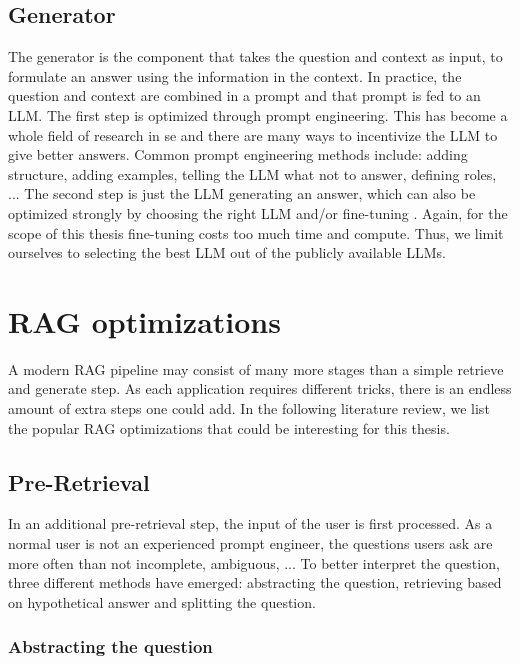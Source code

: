 \subsection{Generator}
The generator is the component that takes the question and context as input, to formulate an answer using the information in the context. In practice, the question and context are combined in a prompt and that prompt is fed to an LLM. The first step is optimized through prompt engineering. This has become a whole field of research in se and there are many ways to incentivize the LLM to give better answers. Common prompt engineering methods include: adding structure, adding examples, telling the LLM what not to answer, defining roles, ... \cite{brown2020language, chen2023unleashing, white2023prompt} The second step is just the LLM generating an answer, which can also be optimized strongly by choosing the right LLM and/or fine-tuning \cite{han2024parameter, xu2023parameter}. Again, for the scope of this thesis fine-tuning costs too much time and compute. Thus, we limit ourselves to selecting the best LLM out of the publicly available LLMs.

\section{RAG optimizations}
A modern RAG pipeline may consist of many more stages than a simple retrieve and generate step. As each application requires different tricks, there is an endless amount of extra steps one could add. In the following literature review, we list the popular RAG optimizations that could be interesting for this thesis.

\subsection{Pre-Retrieval}
\label{sec:pre_retrieval}
In an additional pre-retrieval step, the input of the user is first processed. As a normal user is not an experienced prompt engineer, the questions users ask are more often than not incomplete, ambiguous, ... To better interpret the question, three different methods have emerged: abstracting the question, retrieving based on hypothetical answer and splitting the question.

\subsubsection{Abstracting the question}

